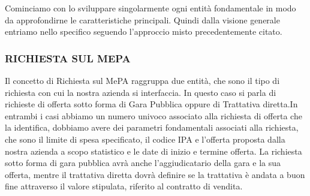 Cominciamo con lo sviluppare singolarmente ogni entità fondamentale in modo da approfondirne le caratteristiche principali. Quindi dalla visione generale entriamo nello specifico seguendo l'approccio misto precedentemente citato.\newline

\subsubsection{RICHIESTA SUL MEPA}
Il concetto di Richiesta sul MePA raggruppa due entità, che sono il tipo di richiesta con cui la nostra azienda si interfaccia. In questo caso si parla di richieste di offerta sotto forma di Gara Pubblica oppure di Trattativa diretta.\newline In entrambi i casi abbiamo un numero univoco associato alla richiesta di offerta che la identifica, dobbiamo avere dei parametri fondamentali associati alla richiesta, che sono il limite di spesa specificato, il codice IPA e l'offerta proposta dalla nostra azienda a scopo statistico e le date di inizio e termine offerta.\newline
La richiesta sotto forma di gara pubblica avrà anche l'aggiudicatario della gara e la sua offerta, mentre il trattativa diretta dovrà definire se la trattativa è andata a buon fine attraverso il valore stipulata, riferito al contratto di vendita.\newline\newline
\noindent{}

